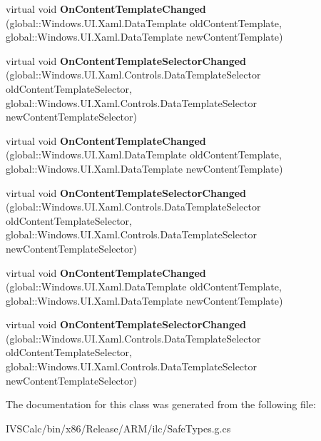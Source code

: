 \begin{DoxyCompactItemize}
virtual void {\bfseries On\+Content\+Template\+Changed} (global\+::\+Windows.\+U\+I.\+Xaml.\+Data\+Template old\+Content\+Template, global\+::\+Windows.\+U\+I.\+Xaml.\+Data\+Template new\+Content\+Template)
\item 
\mbox{\label{class_windows_1_1_u_i_1_1_xaml_1_1_controls_1_1_content_presenter_a1b2a7127c047a13c18f5edd7c107e14e}} 
virtual void {\bfseries On\+Content\+Template\+Selector\+Changed} (global\+::\+Windows.\+U\+I.\+Xaml.\+Controls.\+Data\+Template\+Selector old\+Content\+Template\+Selector, global\+::\+Windows.\+U\+I.\+Xaml.\+Controls.\+Data\+Template\+Selector new\+Content\+Template\+Selector)
\item 
\mbox{\label{class_windows_1_1_u_i_1_1_xaml_1_1_controls_1_1_content_presenter_ad3820a0a82beb44d845344bcf24db5ed}} 
virtual void {\bfseries On\+Content\+Template\+Changed} (global\+::\+Windows.\+U\+I.\+Xaml.\+Data\+Template old\+Content\+Template, global\+::\+Windows.\+U\+I.\+Xaml.\+Data\+Template new\+Content\+Template)
\item 
\mbox{\label{class_windows_1_1_u_i_1_1_xaml_1_1_controls_1_1_content_presenter_a1b2a7127c047a13c18f5edd7c107e14e}} 
virtual void {\bfseries On\+Content\+Template\+Selector\+Changed} (global\+::\+Windows.\+U\+I.\+Xaml.\+Controls.\+Data\+Template\+Selector old\+Content\+Template\+Selector, global\+::\+Windows.\+U\+I.\+Xaml.\+Controls.\+Data\+Template\+Selector new\+Content\+Template\+Selector)
\item 
\mbox{\label{class_windows_1_1_u_i_1_1_xaml_1_1_controls_1_1_content_presenter_ad3820a0a82beb44d845344bcf24db5ed}} 
virtual void {\bfseries On\+Content\+Template\+Changed} (global\+::\+Windows.\+U\+I.\+Xaml.\+Data\+Template old\+Content\+Template, global\+::\+Windows.\+U\+I.\+Xaml.\+Data\+Template new\+Content\+Template)
\item 
\mbox{\label{class_windows_1_1_u_i_1_1_xaml_1_1_controls_1_1_content_presenter_a1b2a7127c047a13c18f5edd7c107e14e}} 
virtual void {\bfseries On\+Content\+Template\+Selector\+Changed} (global\+::\+Windows.\+U\+I.\+Xaml.\+Controls.\+Data\+Template\+Selector old\+Content\+Template\+Selector, global\+::\+Windows.\+U\+I.\+Xaml.\+Controls.\+Data\+Template\+Selector new\+Content\+Template\+Selector)
\end{DoxyCompactItemize}


The documentation for this class was generated from the following file\+:\begin{DoxyCompactItemize}
\item 
I\+V\+S\+Calc/bin/x86/\+Release/\+A\+R\+M/ilc/Safe\+Types.\+g.\+cs\end{DoxyCompactItemize}

